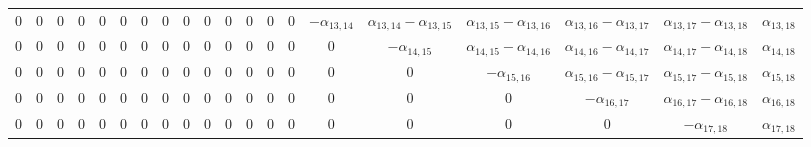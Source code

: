 \begin{tabular}{cccccccccccccccccccc}
$0$ & $0$ & $0$ & $0$ & $0$ & $0$ & $0$ & $0$ & $0$ & $0$ & $0$ & $0$ & $0$ & $0$ & $-\alpha_{13,14}$ & $\alpha_{13,14}-\alpha_{13,15}$ & $\alpha_{13,15}-\alpha_{13,16}$ & $\alpha_{13,16}-\alpha_{13,17}$ & $\alpha_{13,17}-\alpha_{13,18}$ & $\alpha_{13,18}$\\
$0$ & $0$ & $0$ & $0$ & $0$ & $0$ & $0$ & $0$ & $0$ & $0$ & $0$ & $0$ & $0$ & $0$ & $0$ & $-\alpha_{14,15}$ & $\alpha_{14,15}-\alpha_{14,16}$ & $\alpha_{14,16}-\alpha_{14,17}$ & $\alpha_{14,17}-\alpha_{14,18}$ & $\alpha_{14,18}$\\
$0$ & $0$ & $0$ & $0$ & $0$ & $0$ & $0$ & $0$ & $0$ & $0$ & $0$ & $0$ & $0$ & $0$ & $0$ & $0$ & $-\alpha_{15,16}$ & $\alpha_{15,16}-\alpha_{15,17}$ & $\alpha_{15,17}-\alpha_{15,18}$ & $\alpha_{15,18}$\\
$0$ & $0$ & $0$ & $0$ & $0$ & $0$ & $0$ & $0$ & $0$ & $0$ & $0$ & $0$ & $0$ & $0$ & $0$ & $0$ & $0$ & $-\alpha_{16,17}$ & $\alpha_{16,17}-\alpha_{16,18}$ & $\alpha_{16,18}$\\
$0$ & $0$ & $0$ & $0$ & $0$ & $0$ & $0$ & $0$ & $0$ & $0$ & $0$ & $0$ & $0$ & $0$ & $0$ & $0$ & $0$ & $0$ & $-\alpha_{17,18}$ & $\alpha_{17,18}$
\end{tabular}